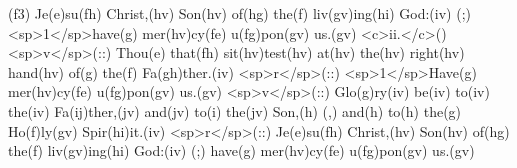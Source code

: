 (f3) Je(e)su(fh) Christ,(hv) Son(hv) of(hg) the(f) liv(gv)ing(hi) God:(iv) (;) <sp>1</sp>have(g) mer(hv)cy(fe) u(fg)pon(gv) us.(gv) <c>ii.</c>() <sp>v</sp>(::) Thou(e) that(fh) sit(hv)test(hv) at(hv) the(hv) right(hv) hand(hv) of(g) the(f) Fa(gh)ther.(iv) <sp>r</sp>(::) <sp>1</sp>Have(g) mer(hv)cy(fe) u(fg)pon(gv) us.(gv) <sp>v</sp>(::) Glo(g)ry(iv) be(iv) to(iv) the(iv) Fa(ij)ther,(jv) and(jv) to(i) the(jv) Son,(h) (,) and(h) to(h) the(g) Ho(f)ly(gv) Spir(hi)it.(iv) <sp>r</sp>(::) Je(e)su(fh) Christ,(hv) Son(hv) of(hg) the(f) liv(gv)ing(hi) God:(iv) (;) have(g) mer(hv)cy(fe) u(fg)pon(gv) us.(gv)
